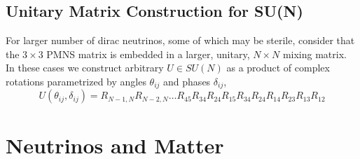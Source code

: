 \documentclass[main.tex]{subfiles}
\begin{document}
\subsection{Unitary Matrix Construction for SU(N)}

For larger number of dirac neutrinos, some of which may be sterile, consider that the $3\times 3$ PMNS matrix is embedded in a larger, unitary, $N\times N$ mixing matrix.
In these cases we construct arbitrary $U\in SU(N)$ as a product of complex rotations parametrized by angles $\theta_{ij}$ and phases $\delta_{ij}$, 
\begin{equation}
    U(\theta_{ij}, \delta_{ij}) = R_{N-1,N}R_{N-2,N}\ldots R_{45}R_{34}R_{24}R_{15}R_{34}R_{24}R_{14}R_{23}R_{13}R_{12}
\end{equation}
\fi

\section{Neutrinos and Matter}

\end{document}
